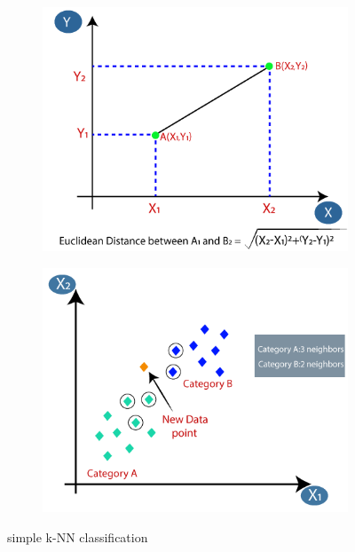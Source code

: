 \documentclass[12pt]{article} %
\theoremstyle{definition}
\begin{document}
\begin{figure}[h]
    \centering
    \begin{subfigure}{.5\textwidth}
        \centering
        \includegraphics[width=\linewidth]{KNN/euclidean.png}
    \end{subfigure}
    \hfill
    \begin{subfigure}{.45\linewidth}
        \centering
        \includegraphics[width=\linewidth]{KNN/KNN.png}
    \end{subfigure}
    \caption{simple k-NN classification\cite{knn4}} 
\end{figure}
\end{document}
